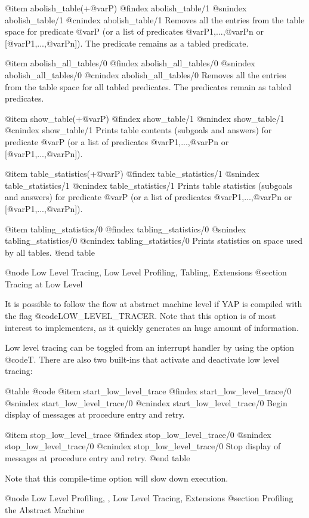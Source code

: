 @item abolish_table(+@var{P})
@findex abolish_table/1
@snindex abolish_table/1
@cnindex abolish_table/1
Removes all the entries from the table space for predicate @var{P} (or
a list of predicates @var{P1},...,@var{Pn} or
[@var{P1},...,@var{Pn}]). The predicate remains as a tabled predicate.

@item abolish_all_tables/0
@findex abolish_all_tables/0
@snindex abolish_all_tables/0
@cnindex abolish_all_tables/0
Removes all the entries from the table space for all tabled
predicates. The predicates remain as tabled predicates.

@item show_table(+@var{P})
@findex show_table/1
@snindex show_table/1
@cnindex show_table/1
Prints table contents (subgoals and answers) for predicate @var{P}
(or a list of predicates @var{P1},...,@var{Pn} or
[@var{P1},...,@var{Pn}]).

@item table_statistics(+@var{P})
@findex table_statistics/1
@snindex table_statistics/1
@cnindex table_statistics/1
Prints table statistics (subgoals and answers) for predicate @var{P}
(or a list of predicates @var{P1},...,@var{Pn} or
[@var{P1},...,@var{Pn}]).

@item tabling_statistics/0
@findex tabling_statistics/0
@snindex tabling_statistics/0
@cnindex tabling_statistics/0
Prints statistics on space used by all tables.
@end table


@node Low Level Tracing, Low Level Profiling, Tabling, Extensions
@section Tracing at Low Level

It is possible to follow the flow at abstract machine level if
YAP is compiled with the flag @code{LOW_LEVEL_TRACER}. Note
that this option is of most interest to implementers, as it quickly generates
an huge amount of information.

Low level tracing can be toggled from an interrupt handler by using the
option @code{T}. There are also two built-ins that activate and
deactivate low level tracing:

@table @code
@item start_low_level_trace
@findex start_low_level_trace/0
@snindex start_low_level_trace/0
@cnindex start_low_level_trace/0
Begin display of messages at procedure entry and retry.

@item stop_low_level_trace
@findex stop_low_level_trace/0
@snindex stop_low_level_trace/0
@cnindex stop_low_level_trace/0
Stop display of messages at procedure entry and retry.
@end table

Note that this compile-time option will slow down execution.

@node Low Level Profiling, , Low Level Tracing, Extensions
@section Profiling the Abstract Machine

